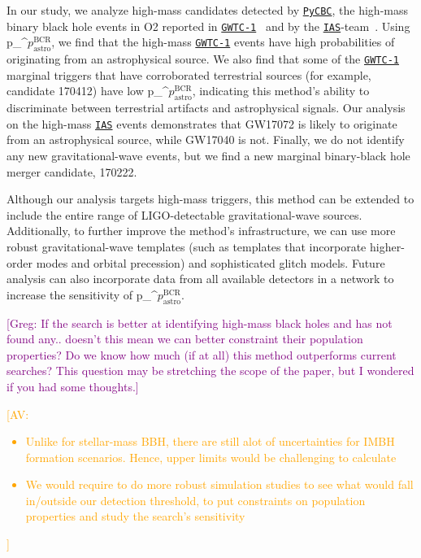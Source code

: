 \documentclass[%
 nofootinbib,
 amsmath,amssymb,
 aps,
 twocolumn,
 superscriptaddress
]{revtex4-2}
\newcommand{\pycbc}{{\sc \href{https://pycbc.org/}{\texttt{PyCBC}}}\xspace}
\newcommand{\GWTC}{{\sc \href{https://ui.adsabs.harvard.edu/abs/2019PhRvX...9c1040A/abstract}{\texttt{GWTC-1}}}\xspace}
\newcommand{\IAS}{{\sc \href{https://ui.adsabs.harvard.edu/abs/2020PhRvD.101h3030V/abstract}{\texttt{IAS}}}\xspace}
\newcommand{\fancytext}[1]{{\relax\ifmmode#1\else $#1$\fi}\xspace}
\newcommand{\pastrobcr}{\fancytext{p_\text{astro}^{\text{BCR}}}}
\newcommand{\avi}[1]{\textcolor{orange}{[AV: #1]}}
\newcommand{\greg}[1]{\textcolor{purple}{[Greg: #1]}}
\begin{document}
In our study, we analyze high-mass candidates detected by \pycbc, the high-mass binary black hole events in O2 reported in \GWTC~\cite{GWTC1} and by the \IAS-team~\cite{IAS1, IAS2}. Using \pastrobcr, we find that the high-mass \GWTC events have high probabilities of originating from an astrophysical source. We also find that some of the \GWTC marginal triggers that have corroborated terrestrial sources (for example, candidate 170412) have low \pastrobcr, indicating this method's ability to discriminate between terrestrial artifacts and astrophysical signals. Our analysis on the high-mass \IAS events demonstrates that GW17072 is likely to originate from an astrophysical source, while GW17040 is not. Finally, we do not identify any new gravitational-wave events, but we find a new marginal binary-black hole merger candidate, 170222. 

Although our analysis targets high-mass triggers, this method can be extended to include the entire range of LIGO-detectable gravitational-wave sources. Additionally, to further improve the method's infrastructure, we can use more robust gravitational-wave templates (such as templates that incorporate higher-order modes and orbital precession) and sophisticated glitch models. Future analysis can also incorporate data from all available detectors in a network to increase the sensitivity of \pastrobcr. 

\greg{If the search is better at identifying high-mass black holes and has not found any.. doesn't this mean we can better constraint their population properties? Do we know how much (if at all) this method outperforms current searches? This question may be stretching the scope of the paper, but I wondered if you had some thoughts.}

\avi{
\begin{itemize}
    \item Unlike for stellar-mass BBH, there are still alot of uncertainties for IMBH formation scenarios. Hence, upper limits would be challenging to calculate
    \item We would require to do more robust simulation studies to see what would fall in/outside our detection threshold, to put constraints on population properties and study the search's sensitivity
\end{itemize}
}

\end{document}
